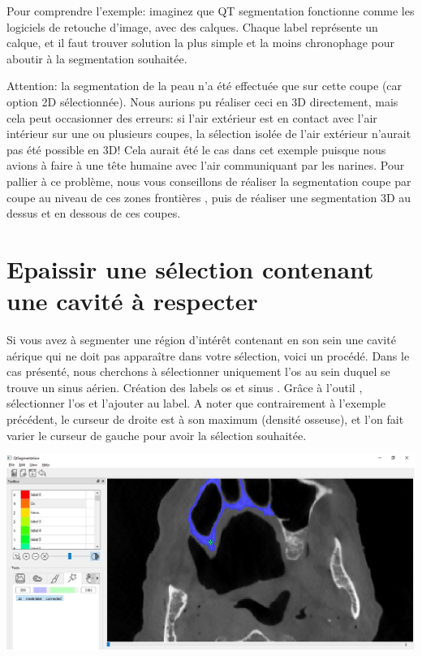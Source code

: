 \documentclass {article}
\begin{document}
Pour comprendre l'exemple: imaginez que QT segmentation fonctionne comme les logiciels de retouche d'image, avec des calques. Chaque label représente un calque, et il faut trouver solution la plus simple et la moins chronophage pour aboutir à la segmentation souhaitée.	

Attention: la segmentation de la peau n'a été effectuée que sur cette coupe (car option 2D sélectionnée). Nous aurions pu réaliser ceci en 3D directement, mais cela peut occasionner des erreurs: si l'air extérieur est en contact avec l'air intérieur sur une ou plusieurs coupes, la sélection isolée de l'air extérieur n'aurait pas été possible en 3D! Cela aurait été le cas dans cet exemple puisque nous avions à faire à une tête humaine avec l'air communiquant par les narines. Pour pallier à ce problème, nous vous conseillons de réaliser la segmentation coupe par coupe au niveau de ces \og zones frontières \fg , puis de réaliser une segmentation 3D au dessus et en dessous de ces coupes.  

\newpage

\section{Epaissir une sélection contenant une cavité à respecter}

Si vous avez à segmenter une région d'intérêt contenant en son sein une cavité aérique qui ne doit pas apparaître dans votre sélection, voici un procédé. Dans le cas présenté, nous cherchons à sélectionner uniquement l'os au sein duquel se trouve un sinus aérien. Création des labels \og os \fg et \og sinus \fg . Grâce à l'outil , sélectionner l'os et l'ajouter au label. A noter que contrairement à l'exemple précédent, le curseur de droite est à son maximum (densité osseuse), et l'on fait varier le curseur de gauche pour avoir la sélection souhaitée.

\begin{center}
\includegraphics[scale=0.5]{Iconographie/Exemple_2_1.jpg}
\end{center}
\end{document}
